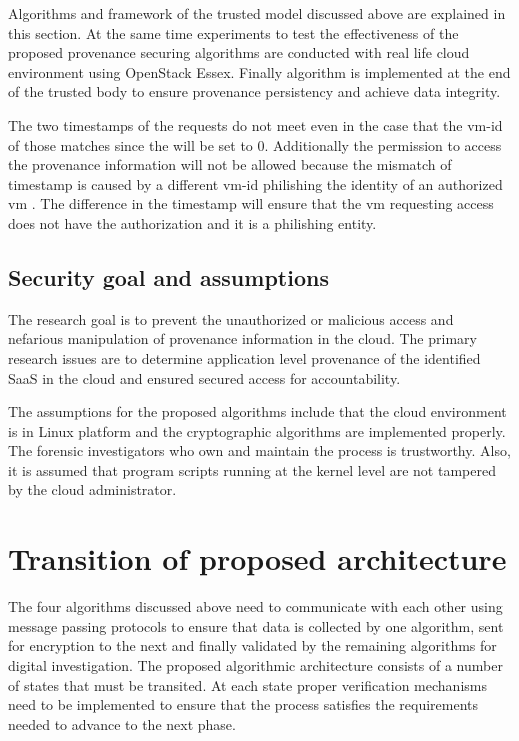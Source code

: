 \documentclass[conference]{IEEEtran}
\begin{document}
Algorithms and framework of the trusted model discussed above are explained in this section. At the same time experiments to test the effectiveness of the proposed provenance securing algorithms are conducted with real life cloud environment using OpenStack Essex. Finally  algorithm is implemented at the end of the trusted body to ensure provenance persistency and achieve data integrity.

The two timestamps of the requests do not meet even in the case that the vm-id of those matches since the  will be set to 0. Additionally the permission to access the provenance information will not be allowed because the mismatch of timestamp is caused by a different vm-id philishing the identity of an authorized vm \cite{asif2013cloudniagara}. The difference in the timestamp will ensure that the vm requesting access does not have the authorization and it is a philishing entity.

\subsection{Security goal and assumptions}

The research goal is to prevent the unauthorized or malicious access and nefarious manipulation of provenance information in the cloud. The primary research issues are to determine application level provenance of the identified SaaS in the cloud and ensured secured access for accountability.



The assumptions for the proposed algorithms include that the cloud environment is in Linux platform and the cryptographic algorithms are implemented properly. The forensic investigators who own and maintain the  process is trustworthy. Also, it is assumed that program scripts running at the kernel level are not tampered by the cloud administrator.

\section{Transition of proposed architecture}

The four algorithms discussed above need to communicate with each other using message passing protocols to ensure that data is collected by one algorithm, sent for encryption to the next and finally validated by the remaining algorithms for digital investigation. The proposed algorithmic architecture consists of a number of states that must be transited. At each state proper verification mechanisms need to be implemented to ensure that the process satisfies the requirements needed to advance to the next phase.
\end{document}
